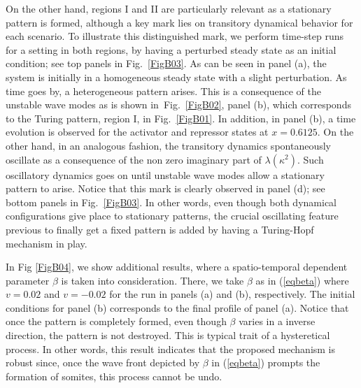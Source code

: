 \documentclass[%
 preprint,
 aip, 
 amsmath,amssymb,
]{revtex4-2}
\begin{document}
On the other hand, regions I and II are particularly relevant as a stationary pattern is formed, although a key mark lies on transitory dynamical behavior for each scenario. To illustrate this distinguished mark, we perform time-step runs for a setting in both regions, by having a perturbed steady state as an initial condition; see top panels in Fig.~\ref{FigB03}. As can be seen in panel (a), the system is initially in a homogeneous steady state with a slight perturbation. As time goes by, a heterogeneous pattern arises. This is a consequence of the unstable wave modes as is shown in~Fig.~\ref{FigB02}, panel (b), which corresponds to the Turing pattern, region I, in Fig.~\ref{FigB01}. In addition, in panel (b), a time evolution is observed for the activator and repressor states at $x=0.6125$. On the other hand, in an analogous fashion, the transitory dynamics spontaneously oscillate as a consequence of the non zero imaginary part of $\lambda(\kappa^2)$. Such oscillatory dynamics goes on until unstable wave modes allow a stationary pattern to arise. Notice that this mark is clearly observed in panel (d); see bottom panels in Fig.~\ref{FigB03}. In other words, even though both dynamical configurations give place to stationary patterns, the crucial oscillating feature previous to finally get a fixed pattern is added by having a Turing-Hopf mechanism in play.
	
In Fig \ref{FigB04}, we show additional results, where a spatio-temporal dependent parameter $\beta$ is taken into consideration. There, we take $\beta$ as in (\ref{eqbeta}) %
where $v=0.02$ and $v=-0.02$ for the run in panels (a) and (b), respectively. The initial conditions for panel (b) corresponds to the final profile of panel (a). Notice that once the pattern is completely formed, even though $\beta$ varies in a inverse direction, the pattern is not destroyed. This is typical trait of a hysteretical process. In other words, this result indicates that the proposed mechanism is robust since, once the wave front depicted by $\beta$ in (\ref{eqbeta}) prompts the formation of somites, this process cannot be undo.

\clearpage



\end{document}
